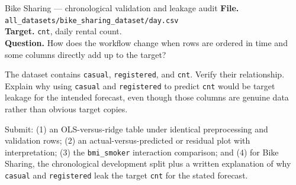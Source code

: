 \begin{kaggleproject}{Bike Sharing --- chronological validation and leakage audit}
\textbf{File.} \texttt{all\_datasets/bike\_sharing\_dataset/day.csv}\\
\textbf{Target.} \texttt{cnt}, daily rental count.\\
\textbf{Question.} How does the workflow change when rows are ordered in time and some columns directly add up to the target?



\begin{debugtask}
The dataset contains \texttt{casual}, \texttt{registered}, and \texttt{cnt}. Verify their relationship. Explain why using \texttt{casual} and \texttt{registered} to predict \texttt{cnt} would be target leakage for the intended forecast, even though those columns are genuine data rather than obvious target copies.
\end{debugtask}
\end{kaggleproject}

\begin{labdeliverable}
Submit: (1) an OLS-versus-ridge table under identical preprocessing and validation rows; (2) an actual-versus-predicted or residual plot with interpretation; (3) the \texttt{bmi\_smoker} interaction comparison; and (4) for Bike Sharing, the chronological development split plus a written explanation of why \texttt{casual} and \texttt{registered} leak the target \texttt{cnt} for the stated forecast.
\end{labdeliverable}
